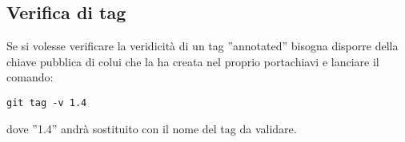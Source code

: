 \subsection{Verifica di tag}
Se si volesse verificare la veridicità di un tag ''annotated'' bisogna disporre della chiave pubblica di colui che la ha creata nel proprio portachiavi e lanciare il comando:

\begin{center}
\texttt{git tag -v 1.4}
\end{center}

dove ''1.4'' andrà sostituito con il nome del tag da validare.